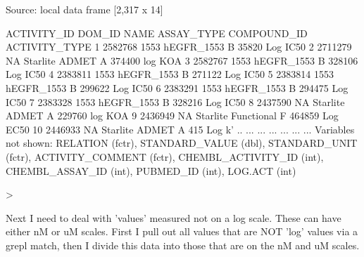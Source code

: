 \documentclass{article}
\begin{document}
\begin{Schunk}
\begin{Soutput}
Source: local data frame [2,317 x 14]

   ACTIVITY_ID DOM_ID                NAME ASSAY_TYPE COMPOUND_ID ACTIVITY_TYPE
1      2582768   1553          hEGFR_1553          B       35820      Log IC50
2      2711279     NA      Starlite ADMET          A      374400       log KOA
3      2582767   1553          hEGFR_1553          B      328106      Log IC50
4      2383811   1553          hEGFR_1553          B      271122      Log IC50
5      2383814   1553          hEGFR_1553          B      299622      Log IC50
6      2383291   1553          hEGFR_1553          B      294475      Log IC50
7      2383328   1553          hEGFR_1553          B      328216      Log IC50
8      2437590     NA      Starlite ADMET          A      229760       log KOA
9      2436949     NA Starlite Functional          F      464859      Log EC50
10     2446933     NA      Starlite ADMET          A         415        Log k'
..         ...    ...                 ...        ...         ...           ...
Variables not shown: RELATION (fctr), STANDARD_VALUE (dbl), STANDARD_UNIT
  (fctr), ACTIVITY_COMMENT (fctr), CHEMBL_ACTIVITY_ID (int), CHEMBL_ASSAY_ID
  (int), PUBMED_ID (int), LOG.ACT (int)
\end{Soutput}
\begin{Sinput}
> 
\end{Sinput}
\end{Schunk}

Next I need to deal with 'values' measured not on a log scale.  These can have either nM or uM scales. First I pull out all values that are NOT 'log' values via a grepl match, then I divide this data into those that are on the nM and uM scales.
\end{document}
